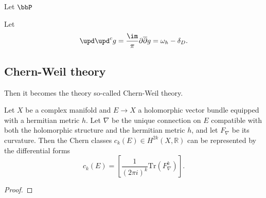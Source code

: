 \begin{example}
	Let $\bbP$

\end{example}

\begin{proposition}
\end{proposition}

\begin{theorem}
	Let
	\[ \upd \upd^c g = \frac{\im}{\pi} \partial \overline{\partial} g = \omega_h - \delta_D. \]
	\Yang{}
\end{theorem}











\subsection{Chern-Weil theory}



Then it becomes the theory so-called Chern-Weil theory.





\begin{theorem}\label{thm:Chern-Weil_theorem}
	Let \(X\) be a complex manifold and \(E \to X\) a holomorphic vector bundle equipped with a hermitian metric \(h\).
	Let \(\nabla\) be the unique connection on \(E\) compatible with both the holomorphic structure and the hermitian metric \(h\), and let \(F_\nabla\) be its curvature.
	Then the Chern classes \(c_k(E) \in H^{2k}(X, \mathbb{R})\) can be represented by the differential forms
	\[c_k(E) = \left[\frac{1}{(2\pi i)^k} \mathrm{Tr} \left( F_\nabla^k \right) \right].\]
\end{theorem}
\begin{proof}
\end{proof}


